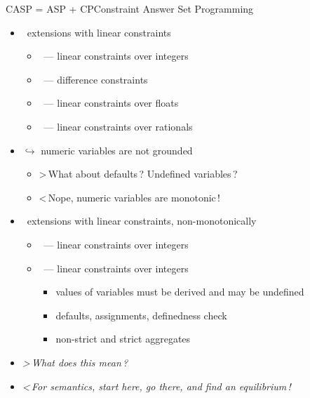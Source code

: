 \begin{frame}{CASP = ASP + CP}{Constraint Answer Set Programming}
  \begin{itemize}
  \item \clingo\ extensions with linear constraints
    \begin{itemize}\normalsize
    \item \clingcon\  --- linear constraints over integers
    \item \clingodl\  --- difference constraints
    \item \clingolp\  --- linear constraints over floats
    \item \clingolpx\ --- linear constraints over rationals
    \end{itemize}
    \smallskip
  \item<only@-2>[] $\bm\hookrightarrow$ numeric variables are not grounded
    \medskip
    \begin{itemize}\normalsize\em
    \item<only@2>[] \alert{>\,What about defaults\,? Undefined variables\,?}
    \item<only@2>[] \alert{<\,Nope, numeric variables are monotonic\,!}
    \end{itemize}
  \item<only@3-> \clingo\ extensions with linear constraints, \alert<4-5>{non-monotonically}
    \begin{itemize}\normalsize
    \item \lctocasp\ --- linear constraints over integers
    \item \flingo\   --- linear constraints over integers
      \begin{itemize}\normalsize
      \item values of variables must be derived and may be undefined
      \item defaults, assignments, definedness check
      \item non-strict and strict aggregates
      \end{itemize}
    \end{itemize}
  \item<only@4-5>[]\alert{\em >\,What does this mean\,?}
  \item<only@5>[]  \alert{\em <\,For semantics, start here, go there, and find an equilibrium\,!}
  \end{itemize}
\end{frame}
